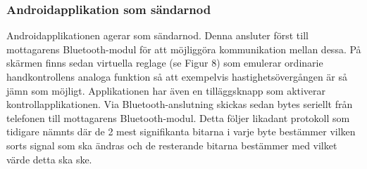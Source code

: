 \documentclass[a4paper]{article}
\begin{document}
\subsubsection{Androidapplikation som sändarnod}
Androidapplikationen agerar som sändarnod. Denna ansluter först till mottagarens Bluetooth-modul för att möjliggöra kommunikation mellan dessa. På skärmen finns sedan virtuella reglage (se Figur 8) som emulerar ordinarie handkontrollens analoga funktion så att exempelvis hastighetsövergången är så jämn som möjligt. Applikationen har även en tilläggsknapp som aktiverar kontrollapplikationen. Via Bluetooth-anslutning skickas sedan bytes seriellt från telefonen till mottagarens Bluetooth-modul. Detta följer likadant protokoll som tidigare nämnts där de 2 mest signifikanta bitarna i varje byte bestämmer vilken sorts signal som ska ändras och de resterande bitarna bestämmer med vilket värde detta ska ske. 
\end{document}
